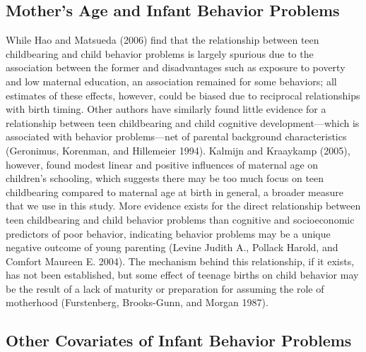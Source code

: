 \documentclass[]{article}
\begin{document}
\subsection{Mother's Age and Infant Behavior
Problems}\label{mothers-age-and-infant-behavior-problems}

While Hao and Matsueda (2006) find that the relationship between teen
childbearing and child behavior problems is largely spurious due to the
association between the former and disadvantages such as exposure to
poverty and low maternal education, an association remained for some
behaviors; all estimates of these effects, however, could be biased due
to reciprocal relationships with birth timing. Other authors have
similarly found little evidence for a relationship between teen
childbearing and child cognitive development---which is associated with
behavior problems---net of parental background characteristics
(Geronimus, Korenman, and Hillemeier 1994). Kalmijn and Kraaykamp
(2005), however, found modest linear and positive influences of maternal
age on children's schooling, which suggests there may be too much focus
on teen childbearing compared to maternal age at birth in general, a
broader measure that we use in this study. More evidence exists for the
direct relationship between teen childbearing and child behavior
problems than cognitive and socioeconomic predictors of poor behavior,
indicating behavior problems may be a unique negative outcome of young
parenting (Levine Judith A., Pollack Harold, and Comfort Maureen E.
2004). The mechanism behind this relationship, if it exists, has not
been established, but some effect of teenage births on child behavior
may be the result of a lack of maturity or preparation for assuming the
role of motherhood (Furstenberg, Brooks-Gunn, and Morgan 1987).

\subsection{Other Covariates of Infant Behavior
Problems}\label{other-covariates-of-infant-behavior-problems}
\end{document}
